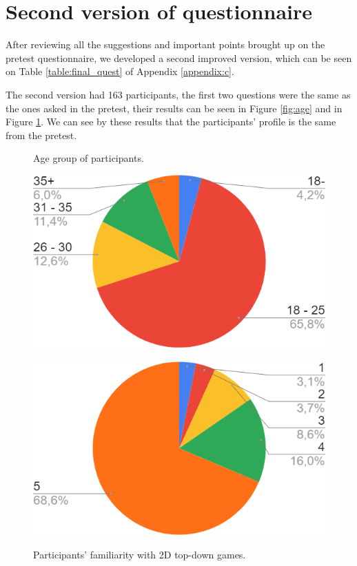 \section{Second version of questionnaire}

After reviewing all the suggestions and important points brought up on the pretest questionnaire, we developed a second improved version, which can be seen on Table \ref{table:final_quest} of Appendix \ref{appendix:c}.

The second version had 163 participants, the first two questions were the same as the ones asked in the pretest, their results can be seen in Figure \ref{fig:age} and in Figure \ref{fig:gamekn}. We can see by these results that the participants' profile is the same from the pretest.

\begin{figure}[h]
  \centering
  \begin{minipage}[b]{0.4\textwidth}
    \caption{Age group of participants.}
    \includegraphics[width=\textwidth]{images/survey/age.png}
    \label{fig:age}
  \end{minipage}
  \hfill
  \begin{minipage}[b]{0.4\textwidth}
    \caption{Participants' familiarity with 2D top-down games.}
    \includegraphics[width=\textwidth]{images/survey/played.png}
    \label{fig:gamekn}
  \end{minipage}
\end{figure}

